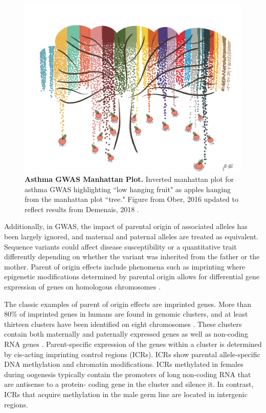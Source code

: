 \begin{figure}
\centering
\includegraphics[width=5in]{img/ch01/fig-01-lowhangingfruit.pdf}
\caption[Asthma GWAS Manhattan Plot.]{\textbf{Asthma GWAS Manhattan Plot.} Inverted manhattan plot for asthma GWAS highlighting ``low hanging fruit" as apples hanging from the manhattan plot ``tree." Figure from Ober, 2016 \cite{Ober:2016ga} updated to reflect results from Demenais, 2018 \cite{Demenais:2018hy}.}
\label{fig:fig-01-lowhangingfruit}
\end{figure}

Additionally, in GWAS, the impact of parental origin of associated alleles has been largely ignored, and maternal and paternal alleles are treated as equivalent. Sequence variants could affect disease susceptibility or a quantitative trait differently depending on whether the variant was inherited from the father or the mother. Parent of origin effects include phenomena such as imprinting where epigenetic modifications determined by parental origin allows for differential gene expression of genes on homologous chromosomes \cite{Lokody2014,Lawson2013}. 

The classic examples of parent of origin effects are imprinted genes. More than 80\% of imprinted genes in humans are found in genomic clusters, and at least thirteen clusters have been identified on eight chromosomes \cite{Lawson2013,Peters2014,Pires2014,Abramowitz2012}. These clusters contain both maternally and paternally expressed genes as well as non-coding RNA genes \cite{Peters2014,Abramowitz2012}. Parent-specific expression of the genes within a cluster is determined by cis-acting imprinting control regions (ICRs). ICRs show parental allele-specific DNA methylation and chromatin modifications. ICRs methylated in females during oogenesis typically contain the promoters of long non-coding RNA that are antisense to a protein- coding gene in the cluster and silence it. In contrast, ICRs that acquire methylation in the male germ line are located in intergenic regions.

